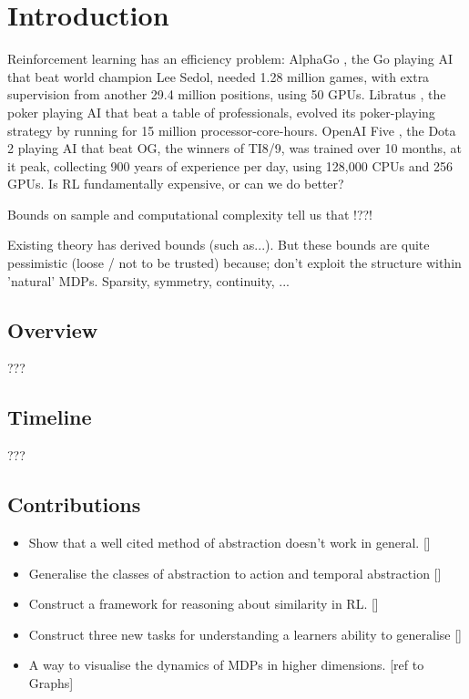 \chapter{Introduction}\label{C:intro}

Reinforcement learning has an efficiency problem: AlphaGo \cite{Silver2016a}, the Go
playing AI that beat world champion Lee Sedol, needed 1.28 million games, with
extra supervision from another 29.4 million positions, using 50 GPUs.
Libratus \cite{Brown2018b}, the poker playing AI that beat a table of professionals,
evolved its poker-playing strategy by running for 15 million processor-core-hours.
OpenAI Five \cite{Berner2019}, the Dota 2 playing AI that beat OG, the winners of TI8/9, was
trained over 10 months, at it peak, collecting 900 years of experience per day, using
128,000 CPUs and 256 GPUs. Is RL fundamentally expensive, or can we do better?

Bounds on sample and computational complexity tell us that !??!



Existing theory has derived bounds (such as...). But these bounds are quite pessimistic (loose / not to be trusted) because;
don't exploit the structure within 'natural' MDPs. Sparsity, symmetry, continuity, ...

\section{Overview}

???

\section{Timeline}

???


\section{Contributions}

\begin{itemize}
  \tightlist
  \item Show that a well cited method of abstraction doesn't work in general. []
  \item Generalise the classes of abstraction to action and temporal abstraction []
  \item Construct a framework for reasoning about similarity in RL. []
  \item Construct three new tasks for understanding a learners ability to generalise []
  \item A way to visualise the dynamics of MDPs in higher dimensions. [ref to Graphs]
\end{itemize}
